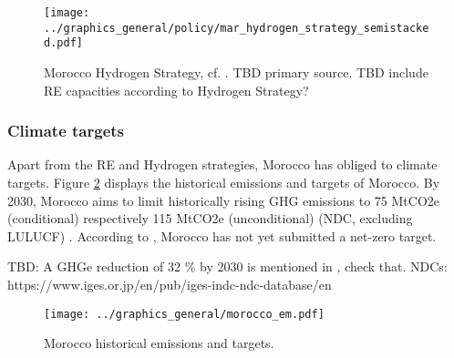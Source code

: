 \begin{figure}
    \centering
    \texttt{[image: ../graphics\_general/policy/mar\_hydrogen\_strategy\_semistacked.pdf]}
    \caption{Morocco Hydrogen Strategy, cf. \cite[p. 14]{Ersoy2022}. TBD primary source. TBD include RE capacities according to Hydrogen Strategy?}
    \label{fig:mar_hydrogen_strategy}
\end{figure}

\subsubsection{Climate targets}
Apart from the RE and Hydrogen strategies, Morocco has obliged to climate targets.
Figure \ref{fig:morocco_em} displays the historical emissions and targets of Morocco.
By 2030, Morocco aims to limit historically rising GHG emissions to 75 MtCO2e (conditional) 
respectively 115 MtCO2e (unconditional) (NDC, excluding LULUCF) \cite{CAT2021}. 
According to \cite{CAT2021}, Morocco has not yet submitted a net-zero target.

TBD: A GHGe reduction of 32 \% by 2030 is mentioned in \cite[5]{Boulakhbar2020}, check that.
NDCs: https://www.iges.or.jp/en/pub/iges-indc-ndc-database/en 


\begin{figure}[h!]
    \centering
    \texttt{[image: ../graphics\_general/morocco\_em.pdf]}
    \caption{Morocco historical emissions and targets.}
    \label{fig:morocco_em}
\end{figure}